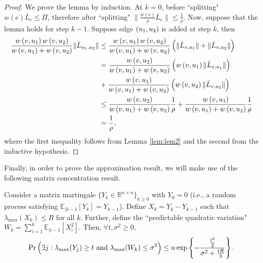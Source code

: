 \documentclass[11pt]{article}
\newcommand{\CExp}[1]{\mathbb{E}_{|#1}}
\begin{document}
\begin{proof}
We prove the lemma by induction. At $ k = 0 $, before ``splitting" $ w(e)\bar{L}_{e} \leq \Pi $, therefore after ``splitting"  $  \lVert \frac{w(e)}{\rho}\bar{L}_{e} \rVert \leq  \frac{1}{\rho} $. Now, suppose that the lemma holds for step $ k-1 $. Suppose edge $ \paren{u_{1}, u_{2}} $ is added at step $ k $, then
	\begin{align*}
	\frac{w\paren{v,u_{1}}w\paren{v,u_{2}}}{w\paren{v,u_{1}} + w\paren{v,u_{2}}}\lVert \bar{L}_{u_{1}, u_{2}} \rVert &\leq \frac{w\paren{v,u_{1}}w\paren{v,u_{2}}}{w\paren{v,u_{1}} + w\paren{v,u_{2}}}\paren{\lVert \bar{L}_{v, u_{1}} \rVert + \lVert \bar{L}_{v, u_{2}} \rVert } \\ 
	&= \frac{w\paren{v,u_{2}}}{w\paren{v,u_{1}} + w\paren{v,u_{2}}}\paren{w\paren{v,u_{1}}\lVert \bar{L}_{v, u_{1}} \rVert} \notag \\ &{}+ \frac{w\paren{v,u_{1}}}{w\paren{v,u_{1}} + w\paren{v,u_{2}}}\paren{w\paren{v,u_{2}}\lVert \bar{L}_{v, u_{2}} \rVert} \\
	&\leq \frac{w\paren{v,u_{2}}}{w\paren{v,u_{1}} + w\paren{v,u_{2}}}\frac{1}{\rho} + \frac{w\paren{v,u_{1}}}{w\paren{v,u_{1}} + w\paren{v,u_{2}}}\frac{1}{\rho} \\
	&= \frac{1}{\rho},
	\end{align*}
where the first inequality follows from Lemma \ref{lem:lem2} and the second from the inductive hypothesis.
\end{proof}

Finally, in order to prove the approximation result, we will make use of the following matrix concentration result.

\begin{theorem}\label{th:freedman}
Consider a matrix martingale $ \{Y_{k}\in\mathbb{R}^{n \times n}\}_{k \geq 0} $ with $ Y_{0} = 0 $ (i.e., a random process satisfying $ \CExp{k-1}[Y_{k}] = Y_{k-1} $). Define $ X_{k} = Y_{k} - Y_{k-1} $ such that $ \lambda_{\text{max}}(X_{k}) \leq R $ for all $ k $. Further, define the ``predictable quadratic variation" $ W_{k} = \sum_{i=1}^{k}\CExp{i-1}[X_{i}^{2}] $. Then, $ \forall t, \sigma^{2} \geq 0 $, 
\begin{equation*}
\mathrm{Pr}\paren{\exists j : \lambda_{\text{max}}(Y_{j}) \geq t \mathrm{~and~} \lambda_{\text{max}}(W_{k}) \leq \sigma^{2}} \leq n\exp\left\{-\frac{\frac{t^{2}}{2}}{\sigma^{2} + \frac{tR}{3}}\right\}.
\end{equation*}
\end{theorem}
\end{document}
